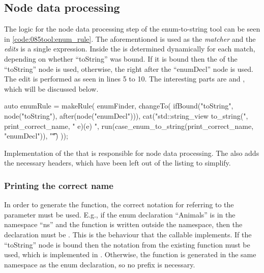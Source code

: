 \subsection{Node data processing} \label{subsec:080dev:085example:050enum:node_processing}
The logic for the node data processing step of the enum-to-string tool can be seen in \cref{code:085tool:enum_rule}.
The aforementioned  is used as the \textit{matcher} and the \textit{edits} is a single  expression.
Inside  the  is determined dynamically for each match, depending on whether ``toString'' was bound. If it is bound then the  of the ``toString'' node is used, otherwise, the  right after the ``enumDecl'' node is used.
The edit is performed as seen in lines 5 to 10. The interesting parts are  and , which will be discussed below.

\begin{listing}[H]
    \begin{cppcode}
auto enumRule = makeRule(
    enumFinder,
    changeTo(
        ifBound("toString", node("toString"), after(node("enumDecl"))),
        cat("\n\nconstexpr std::string_view to_string(",
            print_correct_name,
            " e){\n\tswitch(e) {\n",
            run(case_enum_to_string(print_correct_name, "enumDecl")),
            "\t}\n}")
    ));
    \end{cppcode}
    \caption{Implementation of the  that is responsible for node data processing. The  also adds the necessary headers, which have been left out of the listing to simplify.}
    \label{code:085tool:enum_rule}
\end{listing}

\subsubsection*{Printing the correct name}
In order to generate the  function, the correct notation for referring to the parameter must be used. E.g., if the enum declaration ``Animals'' is in the namespace ``ns'' and the  function is written outside the namespace, then the declaration must be .
This is the behaviour that the callable  implements.
If the ``toString'' node is bound then the notation from the existing  function must be used, which is implemented in  
.
Otherwise, the  function is generated in the same namespace as the enum declaration, so no prefix is necessary.

